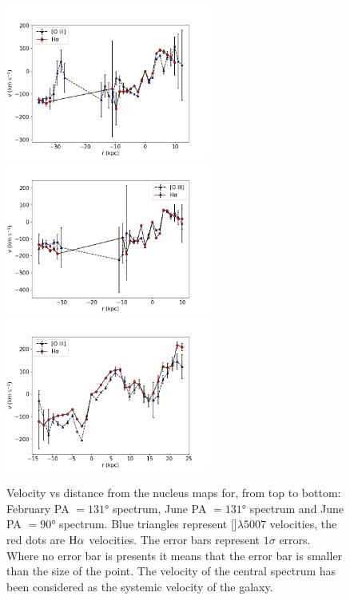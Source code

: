 \documentclass[../main.tex]{subfiles}
\begin{document}
\begin{figure}
\centering
\includegraphics[width=0.6\textwidth]{images/paper3/PA131_2016_velocity.jpg}\\ 
\includegraphics[width=0.6\textwidth]{images/paper3/PA131_velocity.jpg}\\ 
\includegraphics[width=0.6\textwidth]{images/paper3/PA90_velocity.jpg}\\ 
\caption[]{Velocity vs distance from the nucleus maps for, from top to bottom: February PA $=\ang{131}$ spectrum, June PA $=\ang{131}$ spectrum and June PA $=\ang{90}$ spectrum. Blue triangles represent []$\lambda5007$ velocities, the red dots are $\rm H\alpha$ velocities.
The error bars represent $1\sigma$ errors. Where no error bar is presents it means that the error bar is smaller than the size of the point. The velocity of the central spectrum has been considered as the systemic velocity of the galaxy.} 
\label{fig:velocity_lines}
\end{figure} 
\end{document}
